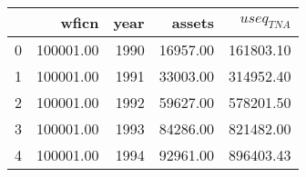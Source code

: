 \begin{tabular}{lrrrr}
\toprule
 & wficn & year & assets & $useq_{TNA}$ \\
\midrule
0 & 100001.00 & 1990 & 16957.00 & 161803.10 \\
1 & 100001.00 & 1991 & 33003.00 & 314952.40 \\
2 & 100001.00 & 1992 & 59627.00 & 578201.50 \\
3 & 100001.00 & 1993 & 84286.00 & 821482.00 \\
4 & 100001.00 & 1994 & 92961.00 & 896403.43 \\
\bottomrule
\end{tabular}
